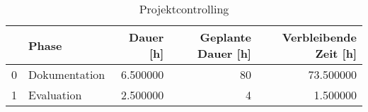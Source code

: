 \begin{table}[H]


\begin{tabular}{llrrr}
\toprule
 & Phase & Dauer [h] & Geplante Dauer [h] & Verbleibende Zeit [h] \\
\midrule
0 & Dokumentation & 6.500000 & 80 & 73.500000 \\
1 & Evaluation & 2.500000 & 4 & 1.500000 \\
\bottomrule
\end{tabular}
\caption{Projektcontrolling} \label{projektcontrolling}
\end{table}
